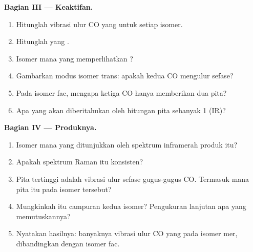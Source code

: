 \begin{problem}
\medskip\noindent\textbf{Bagian III --- Keaktifan.}
\begin{enumerate}[resume, beginpenalty=10000]
  \item Hitunglah vibrasi ulur CO yang  untuk setiap isomer.
  \item Hitunglah yang .
  \item Isomer mana yang memperlihatkan ?
  \item Gambarkan modus  isomer trans: apakah kedua CO mengulur sefase?
  \item Pada isomer fac, mengapa ketiga CO hanya memberikan dua pita?
  \item Apa yang akan diberitahukan oleh hitungan pita sebanyak 1 (IR)?
\end{enumerate}

\medskip\noindent\textbf{Bagian IV --- Produknya.}
\begin{enumerate}[resume, beginpenalty=10000]
  \item Isomer mana yang ditunjukkan oleh spektrum inframerah produk itu?
  \item Apakah spektrum Raman itu konsisten?
  \item Pita tertinggi adalah vibrasi ulur sefase gugus-gugus CO. Termasuk
         mana pita itu pada isomer tersebut?
  \item Mungkinkah itu campuran kedua isomer? Pengukuran lanjutan apa yang memutuskannya?
  \item Nyatakan hasilnya: banyaknya vibrasi ulur CO yang  pada isomer
        mer, dibandingkan dengan isomer fac.
\end{enumerate}
\end{problem}
